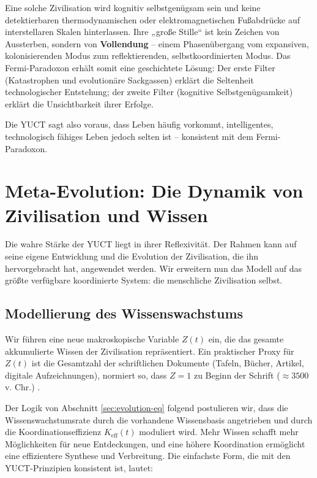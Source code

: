 \documentclass[12pt,a4paper]{article}
\theoremstyle{remark}
\begin{document}
	Eine solche Zivilisation wird kognitiv selbstgenügsam sein und keine detektierbaren thermodynamischen oder elektromagnetischen Fußabdrücke auf interstellaren Skalen hinterlassen. Ihre „große Stille“ ist kein Zeichen von Aussterben, sondern von \textbf{Vollendung} – einem Phasenübergang vom expansiven, kolonisierenden Modus zum reflektierenden, selbstkoordinierten Modus. Das Fermi-Paradoxon erhält somit eine geschichtete Lösung: Der erste Filter (Katastrophen und evolutionäre Sackgassen) erklärt die Seltenheit technologischer Entstehung; der zweite Filter (kognitive Selbstgenügsamkeit) erklärt die Unsichtbarkeit ihrer Erfolge.
	
	Die YUCT sagt also voraus, dass Leben häufig vorkommt, intelligentes, technologisch fähiges Leben jedoch selten ist – konsistent mit dem Fermi-Paradoxon.
	
	\section{Meta-Evolution: Die Dynamik von Zivilisation und Wissen}
	\label{sec:meta-evolution}
	
	Die wahre Stärke der YUCT liegt in ihrer Reflexivität. Der Rahmen kann auf seine eigene Entwicklung und die Evolution der Zivilisation, die ihn hervorgebracht hat, angewendet werden. Wir erweitern nun das Modell auf das größte verfügbare koordinierte System: die menschliche Zivilisation selbst.
	
	\subsection{Modellierung des Wissenswachstums}
	
	Wir führen eine neue makroskopische Variable $Z(t)$ ein, die das gesamte akkumulierte Wissen der Zivilisation repräsentiert. Ein praktischer Proxy für $Z(t)$ ist die Gesamtzahl der schriftlichen Dokumente (Tafeln, Bücher, Artikel, digitale Aufzeichnungen), normiert so, dass $Z=1$ zu Beginn der Schrift ($\approx 3500$ v. Chr.) \cite{Buringh2009, Desai2026}.
	
	Der Logik von Abschnitt \ref{sec:evolution-eq} folgend postulieren wir, dass die Wissenswachstumsrate durch die vorhandene Wissensbasis angetrieben und durch die Koordinationseffizienz $K_{\text{eff}}(t)$ moduliert wird. Mehr Wissen schafft mehr Möglichkeiten für neue Entdeckungen, und eine höhere Koordination ermöglicht eine effizientere Synthese und Verbreitung. Die einfachste Form, die mit den YUCT-Prinzipien konsistent ist, lautet:
	
\end{document}
